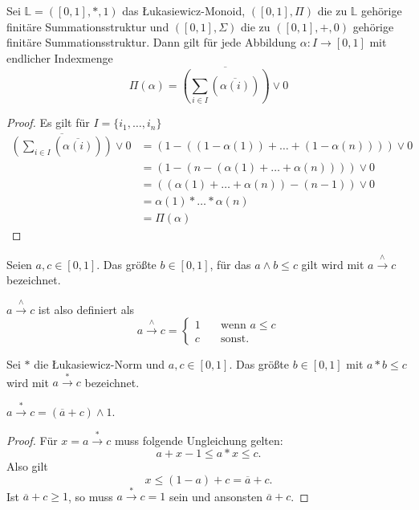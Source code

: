 \documentclass{article}
\begin{document}
\begin{theorem}
  Sei $\mathbb{L} = ([0, 1], \ast, 1)$ das Łukasiewicz-Monoid,
  $([0, 1], \Pi)$ die zu $\mathbb{L}$ gehörige finitäre Summationsstruktur
  und $([0, 1], \Sigma)$ die zu $([0, 1], +, 0)$ gehörige finitäre Summationsstruktur.
  Dann gilt für jede Abbildung $\alpha \colon I \to [0, 1]$
  mit endlicher Indexmenge
  \begin{equation*}
    \Pi(\alpha) = \overline{(\sum_{i \in I}(\overline{\alpha(i)}))} \vee 0
  \end{equation*}
\end{theorem}
\begin{proof}
  Es gilt für $I = \{i_1, \dots, i_n\}$
  \begin{align*}
    \overline{(\sum_{i \in I}(\overline{\alpha(i)}))} \vee 0
    &= (1-((1 - \alpha(1)) + \dots + (1 - \alpha(n)))) \vee 0 \\
    &= (1 - (n - (\alpha(1) + \dots + \alpha(n)))) \vee 0 \\
    &= ((\alpha(1) + \dots + \alpha(n)) - (n - 1)) \vee 0 \\
    &= \alpha(1) \ast \dots \ast \alpha(n) \\
    &= \Pi(\alpha)
  \end{align*}
\end{proof}

\begin{definition}
  Seien $a, c \in [0, 1]$. Das größte $b \in [0, 1]$, für das $a \wedge b \leq c$ gilt wird mit $a \overset{\wedge}{\rightarrow} c$ bezeichnet.

  $a \overset{\wedge}{\rightarrow} c$ ist also definiert als 
  \[   
  a \overset{\wedge}{\rightarrow} c = 
    \begin{cases}
      1 &\quad\text{wenn } a \leq c \\
      c &\quad\text{sonst.}
    \end{cases}
  \]
\end{definition}

\begin{definition}
  Sei $\ast$ die Łukasiewicz-Norm und $a, c \in [0, 1]$.
  Das größte $b \in [0, 1]$ mit $a \ast b \leq c$ wird mit $a \overset{\ast}{\rightarrow} c$ bezeichnet.
\end{definition}

\begin{theorem}
  $a \overset{\ast}{\rightarrow} c = (\overline{a} + c) \wedge 1$.
\end{theorem}
\begin{proof}
  Für $x = a \overset{\ast}{\rightarrow} c$ muss folgende Ungleichung gelten:
  \begin{equation*}
    a + x - 1 \leq a \ast x \leq c.
  \end{equation*}
  Also gilt
  \begin{equation*}
    x \leq (1 - a) + c = \overline{a} + c.
  \end{equation*}
  Ist $\overline{a} + c \geq 1$, so muss $a \overset{\ast}{\rightarrow} c = 1$ sein und ansonsten $\overline{a} + c$.
\end{proof}
\end{document}
